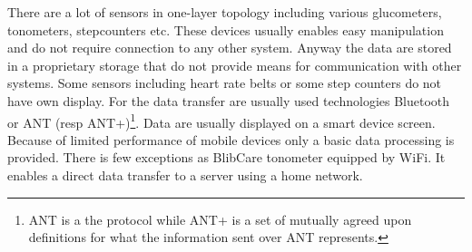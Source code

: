 \documentclass[a4paper,twoside]{article}
\begin{document}
There are a lot of sensors in one-layer topology including various glucometers, tonometers, stepcounters etc. These devices usually enables easy manipulation and do not require connection to any other system. Anyway the data are stored in a proprietary storage that do not provide means for communication with other systems. Some sensors including heart rate belts or some step counters do not have own display. For the data transfer are usually used technologies Bluetooth or ANT (resp ANT+)\footnote{ANT is a the protocol while ANT+ is a set of mutually agreed upon definitions for what the information sent over ANT represents.}. Data are usually displayed on a smart device screen. Because of limited performance of mobile devices only a basic data processing is provided. There is few exceptions as BlibCare tonometer equipped by WiFi. It enables a direct data transfer to a server using a home network. 
\end{document}
